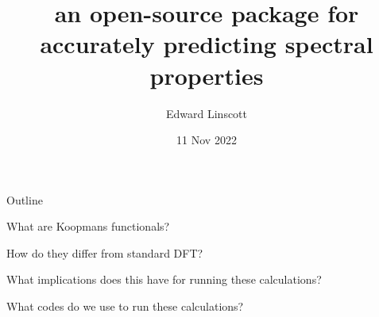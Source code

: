 \documentclass[xcolor=table,aspectratio=169]{beamer}
\title{\noindent\large{an open-source package for accurately predicting spectral properties}}
\author{Edward Linscott}
\institute{EPFL}
\date{11 Nov 2022}
\newcommand\blfootcite[1]{%
  \begingroup
  \renewcommand\thefootnote{}\footnote{\hspace{-4ex}\cite{#1}}%
  \addtocounter{footnote}{-1}%
  \endgroup
}
\numberwithin{equation}{section}
\begin{document}
\frame{\titlepage}

\begin{frame}{Outline}

   What are Koopmans functionals?

   How do they differ from standard DFT?

   What implications does this have for running these calculations?

   What codes do we use to run these calculations?

\end{frame}


% 
% 
% 
% 
% 
% 
\end{document}
